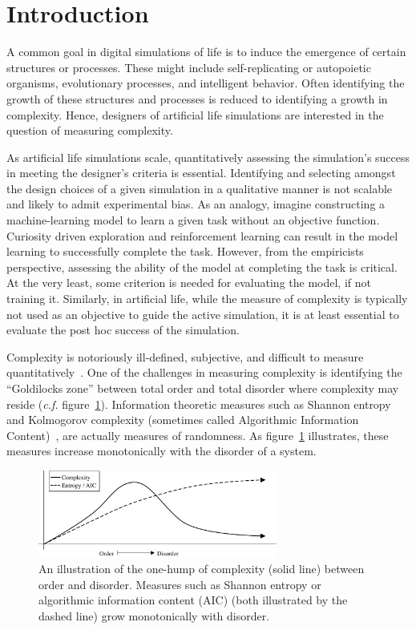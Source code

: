 \section{Introduction}
\label{sec:intro}

A common goal in digital simulations of life is to induce the emergence of
certain structures or processes. These might include self-replicating or
autopoietic organisms, evolutionary processes, and intelligent behavior. Often
identifying the growth of these structures and processes is reduced to
identifying a growth in complexity. Hence, designers of artificial life
simulations are interested in the question of measuring complexity.

As artificial life simulations scale, quantitatively assessing the simulation's
success in meeting the designer's criteria is essential.  Identifying and
selecting amongst the design choices of a given simulation in a qualitative
manner is not scalable and likely to admit experimental bias. As an analogy,
imagine constructing a machine-learning model to learn a given task without an
objective function. Curiosity driven exploration and reinforcement learning can
result in the model learning to successfully complete the task.  However, from
the empiricists perspective, assessing the ability of the model at completing
the task is critical. At the very least, some criterion is needed for
evaluating the model, if not training it. Similarly, in artificial life, while
the measure of complexity is typically not used as an objective to guide the
active simulation, it is at least essential to evaluate the post hoc success of
the simulation.

Complexity is notoriously ill-defined, subjective, and difficult to measure
quantitatively~\citep{gell2002complexity, mitchell2009complexity,
wiesner2019measuring}. One of the challenges in measuring complexity is
identifying the ``Goldilocks zone'' between total order and total disorder
where complexity may reside (\emph{c.f.}
figure~\ref{fig:complexity_and_entropy}). Information theoretic measures such
as Shannon entropy~\citep{shannon1948} and Kolmogorov complexity (sometimes
called Algorithmic Information Content)~\citep{kolmogorov1965, solomonoff1964},
are actually measures of randomness. As figure~\ref{fig:complexity_and_entropy}
illustrates, these measures increase monotonically with the disorder of a
system.

\begin{figure}
\centering
\includegraphics[width=0.7\textwidth]{figures/complexity_and_entropy}
\caption{An illustration of the one-hump of complexity (solid line) between
order and disorder. Measures such as Shannon entropy or algorithmic
information content (AIC) (both illustrated by the dashed line) grow
monotonically with disorder.}
\label{fig:complexity_and_entropy}
\end{figure}

